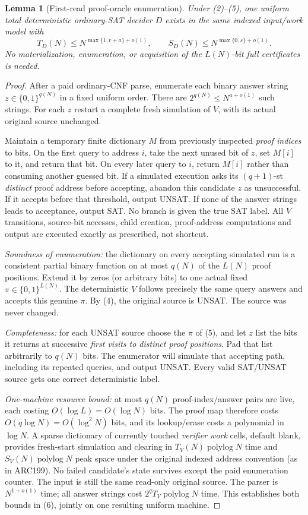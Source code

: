 \documentclass[11pt]{article}
\newtheorem{lemma}[theorem]{Lemma}
\begin{document}
\begin{lemma}[First-read proof-oracle enumeration]
\label{le:oracle}
Under (2)--(5), one uniform total deterministic ordinary-SAT
decider $D$ exists in the \emph{same} indexed input/work model with
\[
 \boxed{T_D(N)\le N^{\max\{1,r+a\}+o(1)},\qquad
 S_D(N)\le N^{\max\{0,s\}+o(1)}.}
 \tag{6}
\]
No materialization, enumeration, or acquisition of the
$L(N)$-bit full certificates is needed.
\end{lemma}
\begin{proof}
After a paid ordinary-CNF parse, enumerate each binary
answer string $z\in\{0,1\}^{q(N)}$ in a fixed uniform order.
There are $2^{q(N)}\le N^{a+o(1)}$ such strings.
For each $z$ restart a complete fresh simulation of $V$,
with its actual original source unchanged.

Maintain a temporary finite dictionary $M$ from
previously inspected \emph{proof indices} to bits.
On the first query to address $i$, take the next unused
bit of $z$, set $M[i]$ to it, and return that bit.
On every later query to $i$, return $M[i]$ rather than
consuming another guessed bit. If a simulated execution
asks its $(q+1)$-st \emph{distinct} proof address before
accepting, abandon this candidate $z$ as unsuccessful.
If it accepts before that threshold, output UNSAT.
If none of the answer strings leads to acceptance,
output SAT. No branch is given the true SAT label.
All $V$ transitions, source-bit accesses, child
creation, proof-address computations and output
are executed exactly as prescribed, not shortcut.

\emph{Soundness of enumeration:} the dictionary on
every accepting simulated run is a consistent partial
binary function on at most $q(N)$ of the $L(N)$
proof positions. Extend it by zeros (or arbitrary bits)
to one actual fixed $\pi\in\{0,1\}^{L(N)}$.
The deterministic $V$ follows precisely the same query
answers and accepts this genuine $\pi$. By (4), the
original source is UNSAT. The source was never changed.

\emph{Completeness:} for each UNSAT source choose the
$\pi$ of (5), and let $z$ list the bits it returns at
successive \emph{first visits to distinct proof positions}.
Pad that list arbitrarily to $q(N)$ bits. The enumerator
will simulate that accepting path, including its repeated
queries, and output UNSAT. Every valid SAT/UNSAT source
gets one correct deterministic label.

\emph{One-machine resource bound:} at most $q(N)$
proof-index/answer pairs are live, each costing
$O(\log L)=O(\log N)$ bits. The proof map therefore
costs $O(q\log N)=O(\log^2 N)$ bits, and its lookup/erase
costs a polynomial in $\log N$. A sparse dictionary of
currently touched \emph{verifier work} cells, default blank,
provides fresh-start simulation and clearing in
$T_V(N)\operatorname{polylog}N$ time and
$S_V(N)\operatorname{polylog}N$ peak space under the
original indexed address convention (as in ARC199).
No failed candidate's state survives except the
paid enumeration counter. The input is still the
same read-only original source. The parser is
$N^{1+o(1)}$ time; all answer strings cost
$2^qT_V\operatorname{polylog}N$ time.
This establishes both bounds in (6), jointly on
one resulting uniform machine.
\end{proof}
\end{document}
